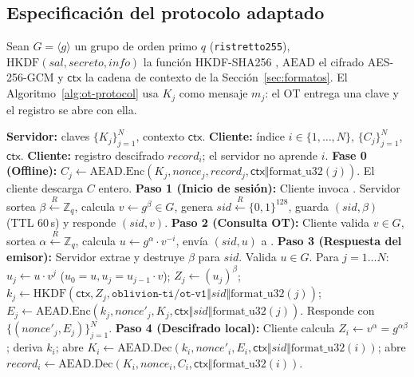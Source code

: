 \subsection{Especificaci\'on del protocolo adaptado}
Sean $G = \langle g \rangle$ un grupo de orden primo $q$ (\texttt{ristretto255}),
$\mathrm{HKDF}(\mathit{sal}, \mathit{secreto}, \mathit{info})$ la funci\'on
HKDF-SHA256 \cite{rfc5869-hkdf}, $\mathrm{AEAD}$ el cifrado AES-256-GCM
\cite{nist-gcm} y $\mathsf{ctx}$ la cadena de contexto de la
Secci\'on~\ref{sec:formatos}. El Algoritmo~\ref{alg:ot-protocol} usa $K_j$
como mensaje $m_j$: el OT entrega una clave y el registro se abre con ella.

\begin{algorithm}[ht]
\caption{Protocolo interactivo OT 1-de-$N$ para entrega privada de $K_i$}
\label{alg:ot-protocol}
\small
\begin{algorithmic}[1]
\Require \textbf{Servidor:} claves $\{K_j\}_{j=1}^N$, contexto $\mathsf{ctx}$. \textbf{Cliente:} \'indice $i \in \{1,\dots,N\}$, $\{C_j\}_{j=1}^N$, $\mathsf{ctx}$.
\Ensure \textbf{Cliente:} registro descifrado $record_i$; el servidor no aprende $i$.
\State \textbf{Fase 0 (Offline):} $C_j \gets \mathrm{AEAD.Enc}(K_j, \mathit{nonce}_j, record_j, \mathsf{ctx}\Vert \mathrm{format\_u32}(j))$. El cliente descarga $C$ entero.
\State \textbf{Paso 1 (Inicio de sesi\'on):} Cliente invoca . Servidor sortea $\beta \xleftarrow{R} \mathbb{Z}_q$, calcula $v \gets g^\beta \in G$,
\State \quad genera $sid \xleftarrow{R} \{0,1\}^{128}$, guarda $(sid, \beta)$ (TTL 60\,s) y responde $(sid, v)$.
\State \textbf{Paso 2 (Consulta OT):} Cliente valida $v \in G$, sortea $\alpha \xleftarrow{R} \mathbb{Z}_q$, calcula $u \gets g^\alpha \cdot v^{-i}$, env\'ia $(sid, u)$ a .
\State \textbf{Paso 3 (Respuesta del emisor):} Servidor extrae y destruye $\beta$ para $sid$. Valida $u \in G$. Para $j = 1 \dots N$:
\State \quad $u_j \gets u \cdot v^j$ ($u_0 = u, u_j = u_{j-1}\cdot v$); $Z_j \gets (u_j)^\beta$;
\State \quad $k_j \gets \mathrm{HKDF}(\mathsf{ctx}, Z_j, \texttt{oblivion-ti/ot-v1}\Vert sid \Vert \mathrm{format\_u32}(j))$;
\State \quad $E_j \gets \mathrm{AEAD.Enc}(k_j, \mathit{nonce}'_j, K_j, \mathsf{ctx}\Vert sid \Vert \mathrm{format\_u32}(j))$. Responde con $\{(\mathit{nonce}'_j, E_j)\}_{j=1}^N$.
\State \textbf{Paso 4 (Descifrado local):} Cliente calcula $Z_i \gets v^\alpha = g^{\alpha\beta}$; deriva $k_i$;
\State \quad abre $K_i \gets \mathrm{AEAD.Dec}(k_i, \mathit{nonce}'_i, E_i, \mathsf{ctx}\Vert sid \Vert \mathrm{format\_u32}(i))$;
\State \quad abre $record_i \gets \mathrm{AEAD.Dec}(K_i, \mathit{nonce}_i, C_i, \mathsf{ctx}\Vert \mathrm{format\_u32}(i))$.
\end{algorithmic}
\end{algorithm}

